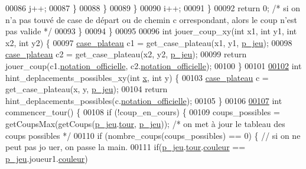 \begin{DoxyCode}
00086                                                 j++;
00087                                         \}
00088                                 \}
00089                         \}
00090                         i++;
00091                 \}
00092                 \textcolor{keywordflow}{return} 0; \textcolor{comment}{/* si on n'a pas touvé de case de départ ou de chemin c
      orrespondant, alors le coup n'est pas valide */}
00093         \}
00094 \}
00095 
00096 \textcolor{keywordtype}{int} jouer\_coup\_xy(\textcolor{keywordtype}{int} x1, \textcolor{keywordtype}{int} y1, \textcolor{keywordtype}{int} x2, \textcolor{keywordtype}{int} y2) \{
00097         \hyperlink{structcase__plateau}{case_plateau} c1 = get\_case\_plateau(x1, y1, \hyperlink{moteur_8h_a3efa8d0f7c65daedc584dc8db048e62c}{p_jeu});
00098         \hyperlink{structcase__plateau}{case_plateau} c2 = get\_case\_plateau(x2, y2, \hyperlink{moteur_8h_a3efa8d0f7c65daedc584dc8db048e62c}{p_jeu});
00099         \textcolor{keywordflow}{return} jouer\_coup(c1.\hyperlink{structcase__plateau_ad510581b324604a9cf685cbb769a421a}{notation_officielle}, c2.\hyperlink{structcase__plateau_ad510581b324604a9cf685cbb769a421a}{notation_officielle});
00100 \}
00101 
\hypertarget{moteur_8c_source_l00102}{}\hyperlink{moteur_8h_ab7a8dc3359ab20fc1f00616ebd4b47a5}{00102} \textcolor{keywordtype}{int} hint\_deplacements\_possibles\_xy(\textcolor{keywordtype}{int} \hyperlink{plateau_8h_a9e00f85b4b6ec2d8bdfbe94ff40f0eeeacab1e15e82c5976bfb476ddfe145263c}{x}, \textcolor{keywordtype}{int} y) \{
00103         \hyperlink{structcase__plateau}{case_plateau} c = get\_case\_plateau(x, y, \hyperlink{moteur_8h_a3efa8d0f7c65daedc584dc8db048e62c}{p_jeu});
00104         \textcolor{keywordflow}{return} hint\_deplacements\_possibles(c.\hyperlink{structcase__plateau_ad510581b324604a9cf685cbb769a421a}{notation_officielle});
00105 \}
00106 
\hypertarget{moteur_8c_source_l00107}{}\hyperlink{moteur_8h_a93014f8aa2a4cb59bdcf0ba5054e86f5}{00107} \textcolor{keywordtype}{int} commencer\_tour() \{
00108         \textcolor{keywordflow}{if} (!coup\_en\_cours) \{
00109                 coups\_possibles = getCoupsMax(getCoups(\hyperlink{moteur_8h_a3efa8d0f7c65daedc584dc8db048e62c}{p_jeu}.\hyperlink{structplateau_ab38c06b0c7e61b9eeb63b04c5e5bc652}{tour}, \hyperlink{moteur_8h_a3efa8d0f7c65daedc584dc8db048e62c}{p_jeu})); \textcolor{comment}{/* on
       met à jour le tableau des coups possibles */}
00110                 \textcolor{keywordflow}{if} (nombre\_coups(coups\_possibles) == 0) \{ \textcolor{comment}{// si on ne peut pas jo
      uer, on passe la main.}
00111                         \textcolor{keywordflow}{if}(\hyperlink{moteur_8h_a3efa8d0f7c65daedc584dc8db048e62c}{p_jeu}.\hyperlink{structplateau_ab38c06b0c7e61b9eeb63b04c5e5bc652}{tour}.\hyperlink{structjoueur_a057f95a41503a890f27c651969ffac8d}{couleur} == \hyperlink{moteur_8h_a3efa8d0f7c65daedc584dc8db048e62c}{p_jeu}.joueur1.\hyperlink{structjoueur_a057f95a41503a890f27c651969ffac8d}{couleur})

\end{DoxyCode}
